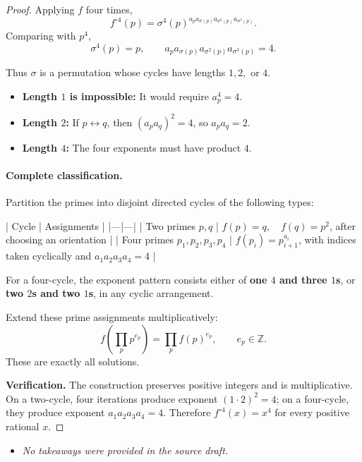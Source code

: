 \begin{dlsummary}[title={\bfseries Solution 58. The Four-Step Prime Labyrinth},breakable]
\begin{proof}
Applying \(f\) four times,
\[
f^{\circ4}(p)
=
\sigma^4(p)^{
a_p a_{\sigma(p)}a_{\sigma^2(p)}a_{\sigma^3(p)}
}.
\]
Comparing with \(p^4\),
\[
\boxed{
\sigma^4(p)=p,\qquad
a_p a_{\sigma(p)}a_{\sigma^2(p)}a_{\sigma^3(p)}=4.
} \tag{2}
\]

Thus \(\sigma\) is a permutation whose cycles have lengths \(1,2,\) or \(4\).

\begin{itemize}
\item \textbf{Length \(1\) is impossible:} It would require \(a_p^4=4\).
\item \textbf{Length \(2\):} If \(p\leftrightarrow q\), then \((a_pa_q)^2=4\), so \(a_pa_q=2\).
\item \textbf{Length \(4\):} The four exponents must have product \(4\).
\end{itemize}

\paragraph{Complete classification.}

Partition the primes into disjoint directed cycles of the following types:

| Cycle | Assignments |
|---|---|
| Two primes \(p,q\) | \(f(p)=q,\quad f(q)=p^2\), after choosing an orientation |
| Four primes \(p_1,p_2,p_3,p_4\) | \(f(p_i)=p_{i+1}^{a_i}\), with indices taken cyclically and \(a_1a_2a_3a_4=4\) |

For a four-cycle, the exponent pattern consists either of \textbf{one \(4\) and three \(1\)s}, or \textbf{two \(2\)s and two \(1\)s}, in any cyclic arrangement.

Extend these prime assignments multiplicatively:
\[
f\!\left(\prod_p p^{e_p}\right)
=\prod_p f(p)^{e_p},
\qquad e_p\in\mathbb Z.
\]
These are exactly all solutions.

\textbf{Verification.} The construction preserves positive integers and is multiplicative. On a two-cycle, four iterations produce exponent \((1\cdot2)^2=4\); on a four-cycle, they produce exponent \(a_1a_2a_3a_4=4\). Therefore \(f^{\circ4}(x)=x^4\) for every positive rational \(x\).
\end{proof}
\end{dlsummary}

\begin{takeaways}
\begin{itemize}
\item \emph{No takeaways were provided in the source draft.}
\end{itemize}
\end{takeaways}
